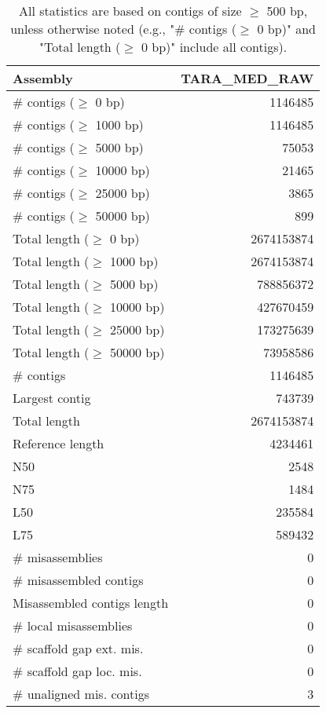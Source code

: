 \documentclass[12pt,a4paper]{article}
\begin{document}
\begin{table}[ht]
\begin{center}
\caption{All statistics are based on contigs of size $\geq$ 500 bp, unless otherwise noted (e.g., "\# contigs ($\geq$ 0 bp)" and "Total length ($\geq$ 0 bp)" include all contigs).}
\begin{tabular}{|l*{1}{|r}|}
\hline
Assembly & TARA\_MED\_RAW \\ \hline
\# contigs ($\geq$ 0 bp) & 1146485 \\ \hline
\# contigs ($\geq$ 1000 bp) & 1146485 \\ \hline
\# contigs ($\geq$ 5000 bp) & 75053 \\ \hline
\# contigs ($\geq$ 10000 bp) & 21465 \\ \hline
\# contigs ($\geq$ 25000 bp) & 3865 \\ \hline
\# contigs ($\geq$ 50000 bp) & 899 \\ \hline
Total length ($\geq$ 0 bp) & 2674153874 \\ \hline
Total length ($\geq$ 1000 bp) & 2674153874 \\ \hline
Total length ($\geq$ 5000 bp) & 788856372 \\ \hline
Total length ($\geq$ 10000 bp) & 427670459 \\ \hline
Total length ($\geq$ 25000 bp) & 173275639 \\ \hline
Total length ($\geq$ 50000 bp) & 73958586 \\ \hline
\# contigs & 1146485 \\ \hline
Largest contig & 743739 \\ \hline
Total length & 2674153874 \\ \hline
Reference length & 4234461 \\ \hline
N50 & 2548 \\ \hline
N75 & 1484 \\ \hline
L50 & 235584 \\ \hline
L75 & 589432 \\ \hline
\# misassemblies & 0 \\ \hline
\# misassembled contigs & 0 \\ \hline
Misassembled contigs length & 0 \\ \hline
\# local misassemblies & 0 \\ \hline
\# scaffold gap ext. mis. & 0 \\ \hline
\# scaffold gap loc. mis. & 0 \\ \hline
\# unaligned mis. contigs & 3 \\ \hline

\end{tabular}
\end{center}
\end{table}
\end{document}
